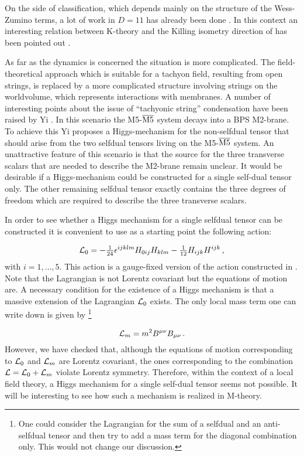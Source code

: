 \documentclass[12pt,a4paper]{article}
\begin{document}
On the side of classification, which depends mainly on the
 structure of the Wess-Zumino terms, a lot of work in $D=11$
 has already been done \cite{Lo1,Lo2}. In this context an interesting
relation between K-theory and the Killing isometry direction of
\cite{Killing} has been pointed out \cite{Vancea}.

As far as the dynamics is concerned the situation is more complicated.
The field-theoretical approach
 which is suitable for a tachyon field, resulting from open strings, is
 replaced by a more complicated structure involving strings on the
 worldvolume, which represents interactions with membranes.
 A number of interesting points about the issue of
 ``tachyonic string'' condensation have been raised by Yi
 \cite{Yi}. In this scenario the M5-$\overline{\rm M5}$ system decays into
a BPS M2-brane.
To achieve this Yi proposes a Higgs-mechanism for the non-selfdual tensor that
should arise from the two selfdual tensors living on the
M5-$\overline{\rm M5}$ system. An unattractive feature of this scenario
is that the source for the three transverse scalars that are needed to
describe the M2-brane remain unclear. It would be desirable if
a Higgs-mechanism could be constructed for a single self-dual tensor only.
The other remaining selfdual tensor exactly contains the three degrees
of freedom which are required to describe the three transverse scalars.

In order to see whether a Higgs mechanism for a single selfdual tensor
can be constructed it is convenient to use as a starting point
the following action:


\begin{equation}
{\cal L}_0 = -{\textstyle{1\over 24}}\epsilon^{ijklm}H_{0ij}H_{klm}
-{\textstyle{1\over 12}}H_{ijk}H^{ijk}\,,
\end{equation}
with $i=1,\ldots,5$.
This action is a gauge-fixed version of the action constructed in \cite{PST}.
Note that the Lagrangian is not Lorentz covariant but the equations of
motion are. A necessary condition for the existence of a Higgs mechanism
is that a massive extension of the Lagrangian ${\cal L}_0$ exists.
The only local mass term one can write down is given by
\footnote{One could consider
the Lagrangian for the sum of a selfdual and an anti-selfdual tensor
and then try to add a mass term for the diagonal combination only.
This would not change our discussion.}

\begin{equation}
{\cal L}_m = m^2 B^{\mu\nu} B_{\mu\nu}\,.
\end{equation}
However, we have checked that, although the equations of motion corresponding
to ${\cal L}_0$ and ${\cal L}_m$ are Lorentz covariant, the ones
corresponding to the combination ${\cal L} = {\cal L}_0 + {\cal L}_m$ violate
Lorentz symmetry. Therefore, within the context of a local field theory,
a Higgs mechanism for a single self-dual tensor seems not possible.
It will be interesting to see how such a mechanism is realized
in M-theory.
\end{document}
